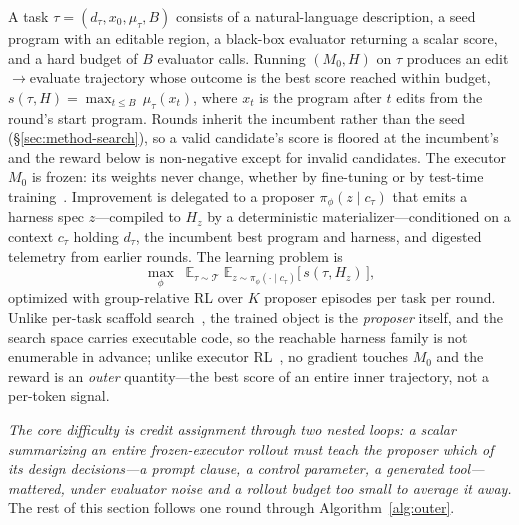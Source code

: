 A task $\tau = (d_\tau, x_0, \mu_\tau, B)$ consists of a natural-language
description, a seed program with an editable region, a black-box evaluator
returning a scalar score, and a hard budget of $B$ evaluator calls.  Running
$(M_0, H)$ on $\tau$ produces an edit$\to$evaluate trajectory whose outcome is
the best score reached within budget,
$s(\tau, H) = \max_{t \le B}\, \mu_\tau(x_t)$, where $x_t$ is the program
after $t$ edits from the round's start program.  Rounds inherit the incumbent rather than the seed
(\S\ref{sec:method-search}), so a valid candidate's score is floored at the
incumbent's and the reward below is non-negative except for invalid candidates.  The executor $M_0$ is frozen:
its weights never change, whether by fine-tuning or by test-time
training~\citep{ttt,ttrl}.  Improvement is delegated to a proposer
$\pi_\phi(z \mid c_\tau)$ that emits a harness spec $z$---compiled to $H_z$ by a
deterministic materializer---conditioned on a context $c_\tau$ holding
$d_\tau$, the incumbent best program and harness, and digested telemetry from
earlier rounds.  The learning problem is
\begin{equation}
\max_\phi \;\; \mathbb{E}_{\tau \sim \mathcal{T}} \;
\mathbb{E}_{z \sim \pi_\phi(\cdot \mid c_\tau)}
\big[\, s(\tau, H_z) \,\big],
\label{eq:objective}
\end{equation}
optimized with group-relative RL over $K$ proposer episodes per task per
round.  Unlike per-task scaffold search~\citep{adas,gepa,aflow,dgm}, the
trained object is the \emph{proposer} itself, and the search space carries
executable code, so the reachable harness family is not enumerable in
advance; unlike executor RL~\citep{grpo,agenticrl}, no gradient touches
$M_0$ and the reward is an \emph{outer} quantity---the best score of an
entire inner trajectory, not a per-token signal.

\emph{The core difficulty is credit assignment through two nested loops: a
scalar summarizing an entire frozen-executor rollout must teach the proposer
which of its design decisions---a prompt clause, a control parameter, a
generated tool---mattered, under evaluator noise and a rollout budget too small
to average it away.}  The rest of this section follows one round through
Algorithm~\ref{alg:outer}.

